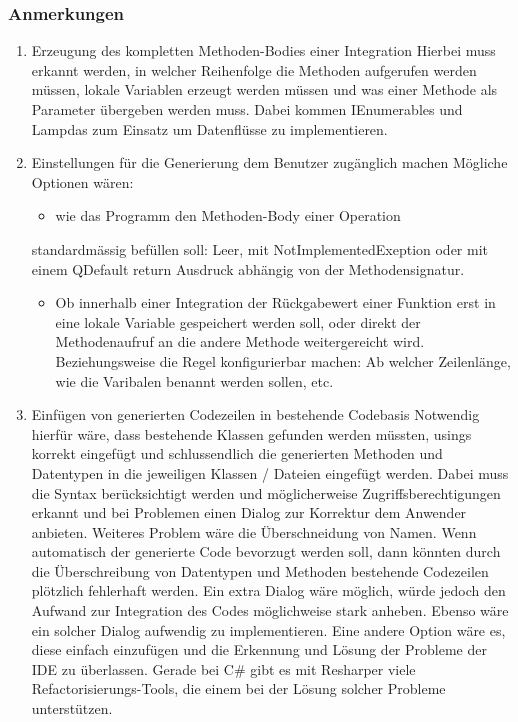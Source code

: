 \documentclass[11pt]{article}
\begin{document}
\subsubsection{Anmerkungen}
\label{sec:orgheadline15}
\begin{enumerate}
\item Erzeugung des kompletten Methoden-Bodies einer Integration
\label{sec:orgheadline12}
Hierbei muss erkannt werden, in welcher Reihenfolge die Methoden aufgerufen
werden müssen, lokale Variablen erzeugt werden müssen und was einer Methode als Parameter
übergeben werden muss. Dabei kommen IEnumerables und Lampdas zum Einsatz um
Datenflüsse zu implementieren. 

\item Einstellungen für die Generierung dem Benutzer zugänglich machen
\label{sec:orgheadline13}
Mögliche Optionen wären:
\begin{itemize}
\item wie das Programm den Methoden-Body einer Operation
\end{itemize}
standardmässig befüllen soll: Leer, mit NotImplementedExeption oder mit einem
QDefault return Ausdruck abhängig von der Methodensignatur. 
\begin{itemize}
\item Ob innerhalb einer Integration der Rückgabewert einer Funktion erst in eine
lokale Variable gespeichert werden soll, oder direkt der Methodenaufruf an die
andere Methode weitergereicht wird. Beziehungsweise die Regel konfigurierbar
machen: Ab welcher Zeilenlänge, wie die Varibalen benannt werden sollen, etc.
\end{itemize}

\item Einfügen von generierten Codezeilen in bestehende Codebasis
\label{sec:orgheadline14}
Notwendig hierfür wäre, dass bestehende Klassen gefunden werden müssten, usings korrekt
eingefügt und schlussendlich die generierten Methoden und Datentypen in die
jeweiligen Klassen / Dateien eingefügt werden. Dabei muss die Syntax
berücksichtigt werden und möglicherweise Zugriffsberechtigungen erkannt und bei
Problemen einen Dialog zur Korrektur dem Anwender anbieten. Weiteres Problem
wäre die Überschneidung von Namen. Wenn automatisch der generierte Code bevorzugt
  werden soll, dann könnten durch die Überschreibung von Datentypen und Methoden
  bestehende Codezeilen plötzlich fehlerhaft werden. Ein extra Dialog wäre
  möglich, würde jedoch den Aufwand zur Integration des Codes möglichweise stark
  anheben. Ebenso wäre ein solcher Dialog aufwendig zu implementieren.
  Eine andere Option wäre es, diese einfach einzufügen und die Erkennung und Lösung der
  Probleme der IDE zu überlassen. Gerade bei C\# gibt es mit Resharper viele
  Refactorisierungs-Tools, die einem bei der Lösung solcher Probleme unterstützen.
\end{enumerate}
\end{document}
